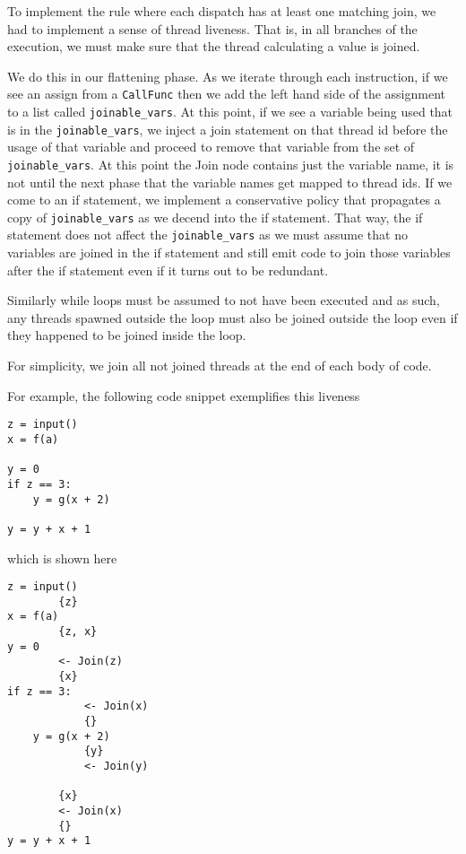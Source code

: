 \documentclass{acm_proc_article-sp}
\begin{document}
To implement the rule where each dispatch has at least one matching join, we
had to implement a sense of thread liveness. That is, in all branches of the
execution, we must make sure that the thread calculating a value is joined.

We do this in our flattening phase. As we iterate through each instruction, if we
see an assign from a \verb|CallFunc| then we add the left hand side of the assignment
to a list called \verb|joinable_vars|. At this point, if we see a variable being
used that is in the \verb|joinable_vars|, we inject a join statement on that thread
id before the usage of that variable and proceed to remove that variable from the set
of \verb|joinable_vars|. At this point the Join node contains just the variable name,
it is not until the next phase that the variable names get mapped to thread ids.
If we come to an if statement, we implement a conservative policy that propagates
a copy of \verb|joinable_vars| as we decend into the if statement. That way, the
if statement does not affect the \verb|joinable_vars| as we must assume that
no variables are joined in the if statement and still emit code to join those variables
after the if statement even if it turns out to be redundant.

Similarly while loops must be assumed to not have been executed and as such, any
threads spawned outside the loop must also be joined outside the loop even if they
happened to be joined inside the loop.

For simplicity, we join all not joined threads at the end of each body of code.


For example, the following code snippet exemplifies this liveness

\begin{verbatim}
z = input()
x = f(a)

y = 0
if z == 3:
    y = g(x + 2)

y = y + x + 1
\end{verbatim}

which is shown here

\begin{verbatim}
z = input()
        {z}
x = f(a)
        {z, x}
y = 0
        <- Join(z)
        {x}
if z == 3:
            <- Join(x)
            {}
    y = g(x + 2)
            {y}
            <- Join(y)

        {x}
        <- Join(x)
        {}
y = y + x + 1
\end{verbatim}
\end{document}
